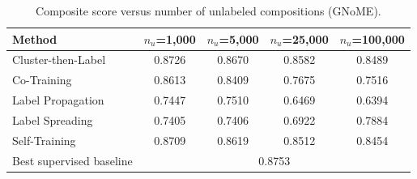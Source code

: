 \begin{table}[H]
\centering\small
\begin{tabular}{lcccc}
\toprule
Method & $n_u$=1,000 & $n_u$=5,000 & $n_u$=25,000 & $n_u$=100,000\\
\midrule
Cluster-then-Label & 0.8726 & 0.8670 & 0.8582 & 0.8489 \\
Co-Training & 0.8613 & 0.8409 & 0.7675 & 0.7516 \\
Label Propagation & 0.7447 & 0.7510 & 0.6469 & 0.6394 \\
Label Spreading & 0.7405 & 0.7406 & 0.6922 & 0.7884 \\
Self-Training & 0.8709 & 0.8619 & 0.8512 & 0.8454 \\
\midrule
Best supervised baseline & \multicolumn{4}{c}{0.8753}\\
\bottomrule
\end{tabular}
\caption*{Composite score versus number of unlabeled compositions (GNoME).}
\end{table}
